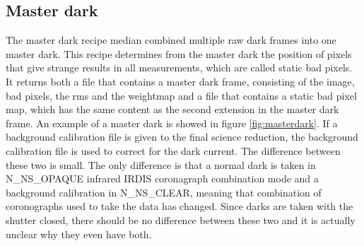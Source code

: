 \documentclass[twoside,single]{lion-msc}
\begin{document}
\subsection{Master dark}
The master dark recipe median combined multiple raw dark frames into one master dark. This recipe determines from the master dark the position of pixels that give strange results in all measurements, which are called static bad pixels. It returns both a file that contains a master dark frame, consisting of the image, bad pixels, the rms and the weightmap and a file that contains a static bad pixel map, which has the same content as the second extension in the master dark frame. An example of a master dark is showed in figure \ref{fig:masterdark}. If a background calibration file is given to the final science reduction, the background calibration file is used to correct for the dark current. The difference between these two is small. The only difference is that a normal dark is taken in N\_NS\_OPAQUE infrared IRDIS coronagraph combination mode and a background calibration in N\_NS\_CLEAR, meaning that combination of coronographs used to take the data has changed. Since darks are taken with the shutter closed, there should be no difference between these two and it is actually unclear why they even have both. \cite{Mouillet2013}
\end{document}
